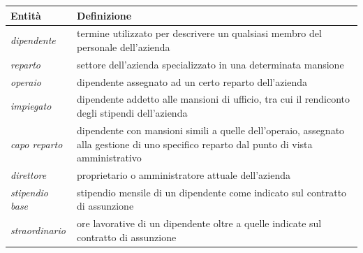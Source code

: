 \documentclass{scrreprt}
\begin{document}
\FloatBarrier
\begin{table}[h|]
\centering
\begin{tabular}{|l|p{12cm}|}
\hline
\textbf{Entità} & \textbf{Definizione} \\ \hline
\textit{dipendente}  & { termine utilizzato per descrivere un qualsiasi membro del personale dell'azienda }                  \\ \hline
\textit{reparto}  & { settore dell'azienda specializzato in una determinata mansione }                  \\ \hline
\textit{operaio}  & { dipendente assegnato ad un certo reparto dell'azienda }                  \\ \hline
\textit{impiegato}  & { dipendente addetto alle mansioni di ufficio, tra cui il rendiconto degli stipendi dell'azienda }                  \\ \hline
\textit{capo reparto}  & { dipendente con mansioni simili a quelle dell'operaio, assegnato alla gestione di uno specifico reparto dal punto di vista amministrativo }                  \\ \hline
\textit{direttore}  & { proprietario o amministratore attuale dell'azienda }                  \\ \hline
\textit{stipendio base}  & { stipendio mensile di un dipendente come indicato sul contratto di assunzione }                  \\ \hline
\textit{straordinario}  & { ore lavorative di un dipendente oltre a quelle indicate sul contratto di assunzione }                  \\ \hline
\end{tabular}
\end{table}
\FloatBarrier

\end{document}
